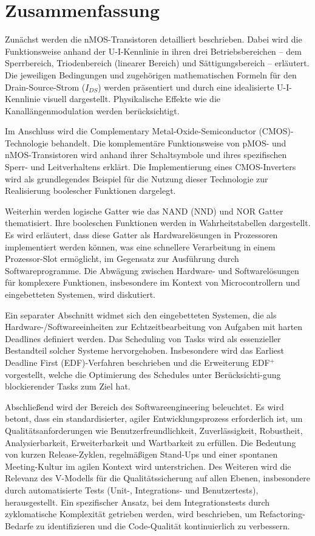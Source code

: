 \documentclass{scrarticle}
\numberwithin{equation}{section}
\begin{document}
\section{Zusammenfassung}
Zunächst werden die nMOS-Transistoren detailliert beschrieben. Dabei wird die Funktionsweise anhand der U-I-Kennlinie in ihren drei Betriebsbereichen -- dem Sperrbereich, Triodenbereich (linearer Bereich) und Sättigungsbereich -- erläutert. Die jeweiligen Bedingungen und zugehörigen mathematischen Formeln für den Drain-Source-Strom ($I_{DS}$) werden präsentiert und durch eine idealisierte U-I-Kennlinie visuell dargestellt. Physikalische Effekte wie die Kanallängenmodulation werden berücksichtigt.

Im Anschluss wird die Complementary Metal-Oxide-Semiconductor (CMOS)-Technologie behandelt. Die komplementäre Funktionsweise von pMOS- und nMOS-Transistoren wird anhand ihrer Schaltsymbole und ihres spezifischen Sperr- und Leitverhaltens erklärt. Die Implementierung eines CMOS-Inverters wird als grundlegendes Beispiel für die Nutzung dieser Technologie zur Realisierung boolescher Funktionen dargelegt.

Weiterhin werden logische Gatter wie das NAND (NND) und NOR Gatter thematisiert. Ihre booleschen Funktionen werden in Wahrheitstabellen dargestellt. Es wird erläutert, dass diese Gatter als Hardwarelösungen in Prozessoren implementiert werden können, was eine schnellere Verarbeitung in einem Prozessor-Slot ermöglicht, im Gegensatz zur Ausführung durch Softwareprogramme. Die Abwägung zwischen Hardware- und Softwarelösungen für komplexere Funktionen, insbesondere im Kontext von Microcontrollern und eingebetteten Systemen, wird diskutiert.

Ein separater Abschnitt widmet sich den eingebetteten Systemen, die als Hardware-/Softwareeinheiten zur Echtzeitbearbeitung von Aufgaben mit harten Deadlines definiert werden. Das Scheduling von Tasks wird als essenzieller Bestandteil solcher Systeme hervorgehoben. Insbesondere wird das Earliest Deadline First (EDF)-Verfahren beschrieben und die Erweiterung EDF$^+$ vorgestellt, welche die Optimierung des Schedules unter Berücksichti-gung blockierender Tasks zum Ziel hat.

Abschließend wird der Bereich des Softwareengineering beleuchtet. Es wird betont, dass ein standardisierter, agiler Entwicklungsprozess erforderlich ist, um Qualitätsanforderungen wie Benutzerfreundlichkeit, Zuverlässigkeit, Robustheit, Analysierbarkeit, Erweiterbarkeit und Wartbarkeit zu erfüllen. Die Bedeutung von kurzen Release-Zyklen, regelmäßigen Stand-Ups und einer spontanen Meeting-Kultur im agilen Kontext wird unterstrichen. Des Weiteren wird die Relevanz des V-Modells für die Qualitätssicherung auf allen Ebenen, insbesondere durch automatisierte Tests (Unit-, Integrations- und Benutzertests), herausgestellt. Ein spezifischer Ansatz, bei dem Integrationstests durch zyklomatische Komplexität getrieben werden, wird beschrieben, um Refactoring-Bedarfe zu identifizieren und die Code-Qualität kontinuierlich zu verbessern.
\end{document}
